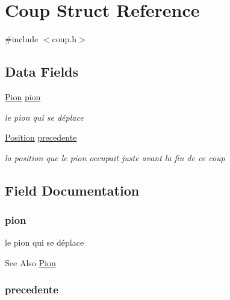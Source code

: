 \hypertarget{struct_coup}{\section{Coup Struct Reference}
\label{struct_coup}
}


{\ttfamily \#include $<$coup.\-h$>$}

\subsection*{Data Fields}
\begin{DoxyCompactItemize}
\item 
\hyperlink{struct_pion}{Pion} \hyperlink{struct_coup_ad71b3ad38e648f9979a7e37f3ac0c258}{pion}
\begin{DoxyCompactList}\small\item\em le pion qui se déplace \end{DoxyCompactList}\item 
\hyperlink{struct_position}{Position} \hyperlink{struct_coup_ad8ae9c3e219037c054305c80f1c4cb2a}{precedente}
\begin{DoxyCompactList}\small\item\em la position que le pion occupait juste avant la fin de ce coup \end{DoxyCompactList}\end{DoxyCompactItemize}


\subsection{Field Documentation}
\hypertarget{struct_coup_ad71b3ad38e648f9979a7e37f3ac0c258}{
\subsubsection[{pion}]{ pion}}\label{struct_coup_ad71b3ad38e648f9979a7e37f3ac0c258}


le pion qui se déplace 

\begin{DoxySeeAlso}{See Also}
\hyperlink{struct_pion}{Pion} 
\end{DoxySeeAlso}
\hypertarget{struct_coup_ad8ae9c3e219037c054305c80f1c4cb2a}{
\subsubsection[{precedente}]{ precedente}}\label{struct_coup_ad8ae9c3e219037c054305c80f1c4cb2a}


